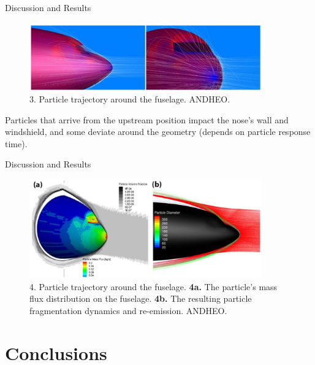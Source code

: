 \documentclass[aspectratio=169,xcolor=dvipsnames]{beamer}
\begin{document}
\begin{frame}{Discussion and Results}
  \begin{figure}[h]
\includegraphics[width=10cm]{images/trajectory.png}
\caption{3. Particle trajectory around the fuselage. \textcopyright ANDHEO.}
\label{Fig2}
\end{figure}
Particles that arrive from the upstream position impact the nose's wall and windshield, and some deviate around the geometry (depends on particle response time).
\end{frame}

\begin{frame}{Discussion and Results}
  \begin{figure}[h]
\includegraphics[width=10cm]{images/trajectory2.png}
\caption{4. Particle trajectory around the fuselage. \textbf{4a.} The particle's mass flux distribution on the fuselage. \textbf{4b.} The resulting particle fragmentation dynamics and re-emission. \textcopyright ANDHEO.}
\label{Fig2}
\end{figure}

\end{frame}


\section{Conclusions}
\end{document}
